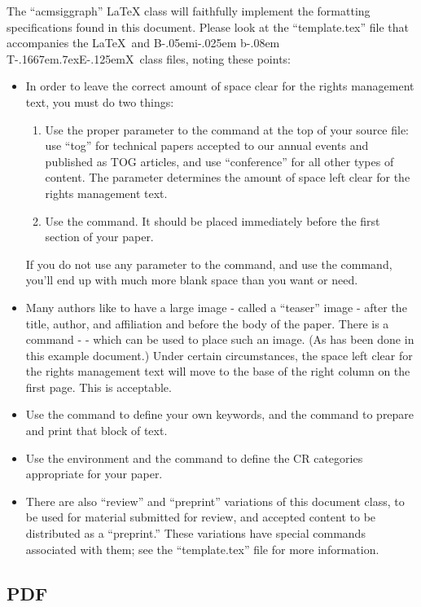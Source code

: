 \documentclass[tog]{acmsiggraph}
\def\BibTeX{{\rm B\kern-.05em{\sc i\kern-.025em b}\kern-.08em
    T\kern-.1667em\lower.7ex\hbox{E}\kern-.125emX}}
\begin{document}
The ``acmsiggraph'' \LaTeX{} class will faithfully implement the formatting specifications found in this document. Please look at the ``template.tex'' file that accompanies the \LaTeX\ and \BibTeX\ class files, noting these points:
\begin{itemize}
\item In order to leave the correct amount of space clear for the rights management text, you must do two things: 
\begin{enumerate}
\item Use the proper parameter to the  command at the top of your source file: use ``tog'' for technical papers accepted to our annual events and published as TOG articles, and use ``conference'' for all other types of content. The parameter determines the amount of space left clear for the rights management text.
\item Use the  command. It should be placed immediately before the first section of your paper.
\end{enumerate}
If you do not use any parameter to the  command, and use the  command, you'll end up with much more blank space than you want or need.

\item Many authors like to have a large image - called a ``teaser'' image - after the title, author, and affiliation and before the body of the paper. There is a command -  - which can be used to place such an image. (As has been done in this example document.) Under certain circumstances, the space left clear for the rights management text will move to the base of the right column on the first page. This is acceptable.
\item Use the  command to define your own keywords, and the  command to prepare and print that block of text.
\item Use the  environment and the  command to define the CR categories appropriate for your paper.
\item There are also ``review'' and ``preprint'' variations of this document class, to be used for material submitted for review, and accepted content to be distributed as a ``preprint.'' These variations have special commands associated with them; see the ``template.tex'' file for more information.
\end{itemize}

\subsection{PDF}
\end{document}
